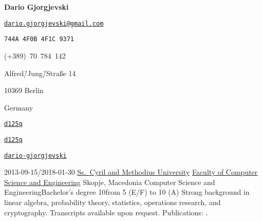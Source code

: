 \documentclass[version=last, fontsize=10pt, paper=A4, toc=bibliography]{scrartcl}%
\begin{document}
\begin{center}
  \huge\bfseries Dario Gjorgjevski
\end{center}

\begin{minipage}[t]{.35\columnwidth}
  \begin{description}[noitemsep, leftmargin=*, widest=\faInbox]
  \item[\faInbox] \href{mailto:dario.gjorgjevski@gmail.com}%
    {\nolinkurl{dario.gjorgjevski@gmail.com}}
  \item[\faKey] \Verb+744A 4F0B 4F1C 9371+
  \item[\faPhone] (+389)~70~784~142
  \end{description}
\end{minipage}
\begin{minipage}[t]{.30\columnwidth}
  \begin{description}[noitemsep, leftmargin=*, widest=\faHome]
  \item[\faHome] Alfred\=/Jung\=/Straße 14
  \item 10369 Berlin
  \item Germany
  \end{description}
\end{minipage}%
\begin{minipage}[t]{.30\columnwidth}
  \begin{description}[noitemsep, leftmargin=*, widest=\faGithub]
  \item[\faGithub] \href{https://github.com/d125q}{\nolinkurl{d125q}}
  \item[\faStackExchange]
    \href{https://stackexchange.com/users/3671527/d125q}%
    {\nolinkurl{d125q}}
  \item[\faLinkedin] \href{https://www.linkedin.com/in/dario-gjorgjevski/}%
    {\nolinkurl{dario-gjorgjevski}}
  \end{description}
\end{minipage}

\label{sec:education}

\EducationEntry%
{2013-09-15/2018-01-30}%
{\href{http://ukim.edu.mk/}{Ss.\ Cyril and Methodius University}}%
{\href{https://finki.ukim.mk/}{Faculty of Computer Science and Engineering}}%
{Skopje, Macedonia}%
{Computer Science and Engineering}{Bachelor's degree}%
{10}{from 5 (E/F) to 10 (A)}%
{%
  Strong background in linear algebra, probability theory, statistics,
  operations research, and cryptography.  Transcripts available upon request.
  Publications: \autocites{Gjorgjevski:Combining_LWE-Solving_Algorithms,
    Gjorgjevski:ECC_in_the_Rank_Metric,
    Gjorgjevski:Using_Distributed_Representations}.%
}
\end{document}
